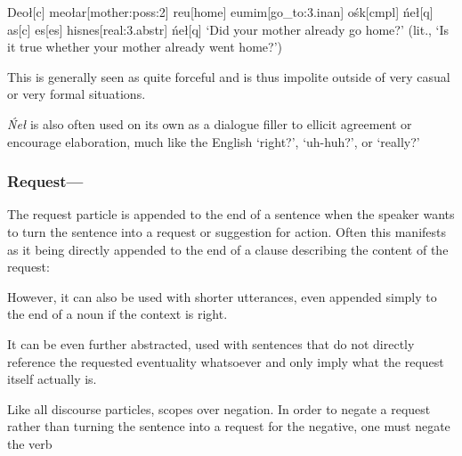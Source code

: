 \documentclass[a4paper,11pt,oneside,openany]{memoir}
\begin{document}
\ex
\begingl
Deo\l[\sc c]
meo\l ar[mother:{\sc poss:2}]
reu[home]
eumim[go\_to:{\sc 3.inan}]
o\'sk[\sc cmpl]
\'ne\l[\sc q]
\nogloss{,}
as[\sc c]
es[\sc es]
hisnes[real:{\sc 3.abstr}]
\'ne\l[\sc q]
\glft `Did your mother already go home?' (lit., `Is it true whether your mother already went home?')
\endgl 
\xe

This is generally seen as quite forceful and is thus impolite outside of very casual or very formal situations.

\textit{\'Ne\l} is also often used on its own as a dialogue filler to ellicit agreement or encourage elaboration, much like the English `right?', `uh-huh?', or `really?'

\subsubsection{Request---}\label{sec:ro}

The request particle is appended to the end of a sentence when the speaker wants to turn the sentence into a request or suggestion for action. Often this manifests as it being directly appended to the end of a clause describing the content of the request:


However, it can also be used with shorter utterances, even appended simply to the end of a noun if the context is right.


It can be even further abstracted, used with sentences that do not directly reference the requested eventuality whatsoever and only imply what the request itself actually is.


Like all discourse particles, %
 scopes over negation. In order to negate a request rather than turning the sentence into a request for the negative, one must negate the verb 

\end{document}
